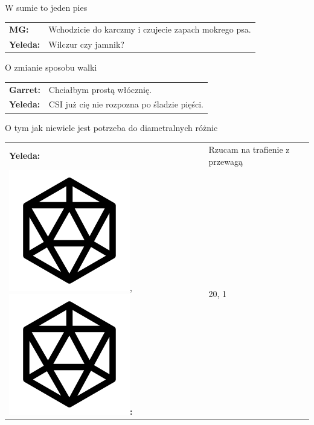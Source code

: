 \documentclass[10pt,twoside,twocolumn]{book}
\begin{document}
\begin{rpg-quotebox}{W sumie to jeden pies}
   \begin{tabularx}{\columnwidth}{lX}
      \textbf{MG:} & Wchodzicie do karczmy i czujecie zapach mokrego psa.\\
      \textbf{Yeleda:} & Wilczur czy jamnik?\\
   \end{tabularx}
\end{rpg-quotebox}

\begin{rpg-quotebox}{O zmianie sposobu walki}
   \begin{tabularx}{\columnwidth}{lX}
      \textbf{Garret:} & Chciałbym prostą włócznię.\\
      \textbf{Yeleda:} & CSI już cię nie rozpozna po śladzie pięści.\\
   \end{tabularx}
\end{rpg-quotebox}

\begin{rpg-quotebox}{O tym jak niewiele jest potrzeba do diametralnych różnic}
   \begin{tabularx}{\columnwidth}{lX}
      \textbf{Yeleda:} & Rzucam na trafienie z przewagą\\
      \includegraphics[scale=0.06]{img/d20.png},\includegraphics[scale=0.06]{img/d20.png}\textbf{:}& 20, 1\\
   \end{tabularx}
\end{rpg-quotebox}
\end{document}
